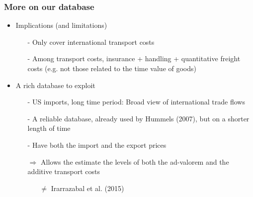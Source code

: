 \documentclass[10 pt,Helvetica, french]{beamer}
\begin{document}
\begin{frame}
\frametitle{More on our database}
\begin{itemize}
\item Implications (and limitations) \vspace{0.1cm}
\begin{itemize}
\item[-] Only cover international transport costs \vspace{0.1cm}
\item[-] Among transport costs, insurance + handling + quantitative freight costs (e.g. not those related to the time value of goods) \vspace{0.1cm}
\end{itemize}
\item A rich database to exploit \vspace{0.1cm}
\begin{itemize}
\item[-] US imports, long time period: Broad view of international trade flows \vspace{0.1cm}
\item[-] A reliable database, already used by Hummels (2007), but on a shorter length of time \vspace{0.1cm}
\item[-] Have both the import and the export prices  \vspace{0.1cm}
\item[$\Rightarrow$] Allows the estimate the levels of both the ad-valorem and the additive transport costs  \vspace{0.1cm}
\begin{itemize}
\item[$\neq$] Irarrazabal et al. (2015)
\end{itemize}
\end{itemize}
\end{itemize}
\end{frame}
\end{document}
